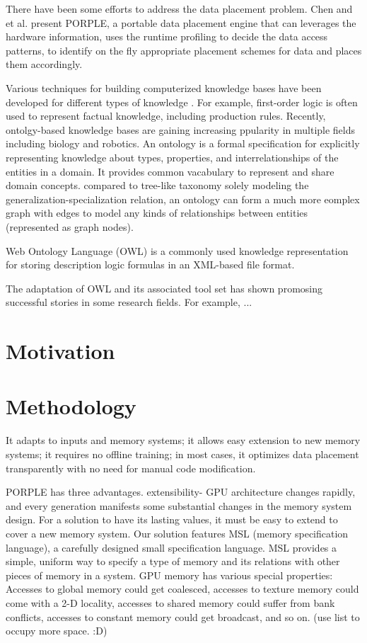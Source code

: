 \documentclass{sig-alternate}
\begin{document}
There have been some efforts to address the data placement problem. Chen and et al. \cite{porple} present PORPLE, a portable data placement engine that can leverages the hardware information, uses the runtime profiling to decide the data access patterns, to identify on the fly appropriate placement schemes for data and places them accordingly. 

Various techniques for building computerized knowledge bases have been developed for different types of knowledge \cite{intro2}. For example, first-order logic is often used to represent factual knowledge, including production rules. Recently, ontolgy-based knowledge bases are gaining increasing ppularity in multiple fields including biology and robotics. An ontology is a formal specification for explicitly representing knowledge about types, properties, and interrelationships of the entities in a domain. It provides common vacabulary to represent and share domain concepts. compared to tree-like taxonomy solely modeling the generalization-specialization relation, an ontology can form a much more eomplex graph with edges to model any kinds of relationships between entities (represented as graph nodes).

Web Ontology Language (OWL) \cite{owl1, owl2} is a commonly used knowledge representation for storing description logic formulas in an XML-based file format.

The adaptation of OWL and its associated tool set has shown promosing successful stories in some research fields. For example, ...

\section{Motivation}

\section{Methodology}

It adapts to inputs and memory systems; it allows easy extension to new memory systems; it requires no offline training; in most cases, it optimizes data placement transparently with no need for manual code modification.

PORPLE has three advantages. 
extensibility- GPU architecture changes rapidly, and every generation manifests some substantial changes in the memory system design. For a solution to have its lasting values, it must be easy to extend to cover a new memory system. 
Our solution features MSL (memory specification language), a carefully designed small specification language. MSL provides a simple, uniform way to specify a type of memory and its relations with other pieces of memory in a system. GPU memory has various special properties: Accesses to global memory could get coalesced, accesses to texture memory could come with a 2-D locality, accesses to shared memory could suffer from bank conflicts, accesses to constant memory could get broadcast, and so on. (use list to occupy more space. :D)
\end{document}

